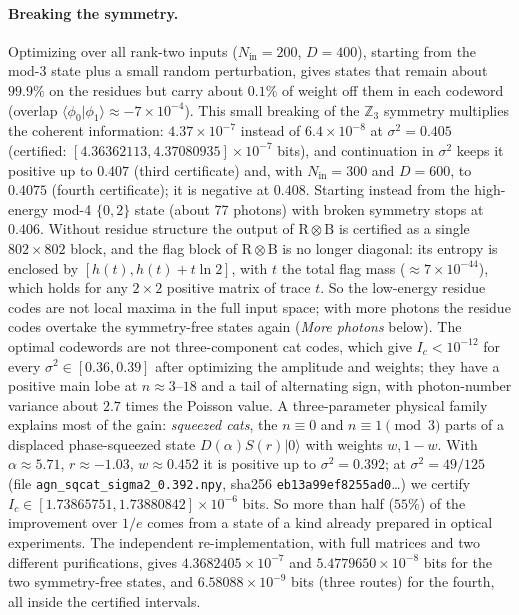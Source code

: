 \documentclass[aps,pra,reprint,superscriptaddress,nofootinbib,longbibliography,floatfix]{revtex4-2}
\theoremstyle{remark}
\newcommand{\ket}[1]{\lvert #1\rangle}
\newcommand{\Ic}{I_c}
\begin{document}
\paragraph*{Breaking the symmetry.} Optimizing over all rank-two inputs ($N_{\mathrm{in}}=200$, $D=400$),
starting from the mod-3 state plus a small random perturbation, gives states that remain about $99.9\%$ on
the residues but carry about $0.1\%$ of weight off them in each codeword (overlap
$\langle\phi_0|\phi_1\rangle\approx-7\times10^{-4}$). This small breaking of the $\mathbb Z_3$ symmetry
multiplies the coherent information: $4.37\times10^{-7}$ instead of $6.4\times10^{-8}$ at $\sigma^2=0.405$
(certified: $[4.36362113,4.37080935]\times10^{-7}$ bits), and continuation in $\sigma^2$ keeps it positive up
to $0.407$ (third certificate) and, with $N_{\mathrm{in}}=300$ and $D=600$, to $0.4075$ (fourth certificate);
it is negative at $0.408$. Starting instead from the high-energy mod-4 $\{0,2\}$ state (about 77 photons)
with broken symmetry stops at $0.406$. Without residue structure
the output of $\mathrm R\otimes\mathrm B$ is certified as a single $802\times802$ block, and the flag block
of $\mathrm R\otimes\mathrm B$ is no longer diagonal: its entropy is enclosed by $[h(t),h(t)+t\ln2]$, with
$t$ the total flag mass ($\approx7\times10^{-44}$), which holds for any $2\times2$ positive matrix of
trace $t$. So the low-energy residue codes are not local maxima in the full input space; with more photons the
residue codes overtake the symmetry-free states again (\emph{More photons} below). The optimal codewords
are not three-component cat codes, which give $\Ic<10^{-12}$ for every $\sigma^2\in[0.36,0.39]$ after
optimizing the amplitude and weights; they have a positive main lobe at $n\approx3$--$18$ and a tail of
alternating sign, with photon-number variance about $2.7$ times the Poisson value. A three-parameter physical family explains most of the
gain: \emph{squeezed cats}, the $n\equiv0$ and $n\equiv1\pmod3$ parts of a displaced phase-squeezed state
$D(\alpha)S(r)\ket0$ with weights $w,1-w$. With $\alpha\approx5.71$, $r\approx-1.03$, $w\approx0.452$ it is positive
up to $\sigma^2=0.392$; at $\sigma^2=49/125$ (file \texttt{agn\_sqcat\_sigma2\_0.392.npy}, sha256
\texttt{eb13a99ef8255ad0}\dots) we certify $\Ic\in[1.73865751,1.73880842]\times10^{-6}$ bits. So more than half ($55\%$) of
the improvement over $1/e$ comes from a state of a kind already prepared in optical experiments. The independent
re-implementation, with full matrices and two different purifications, gives $4.3682405\times10^{-7}$ and
$5.4779650\times10^{-8}$ bits for the two symmetry-free states, and $6.58088\times10^{-9}$ bits (three routes) for
the fourth, all inside the certified intervals.
\end{document}
